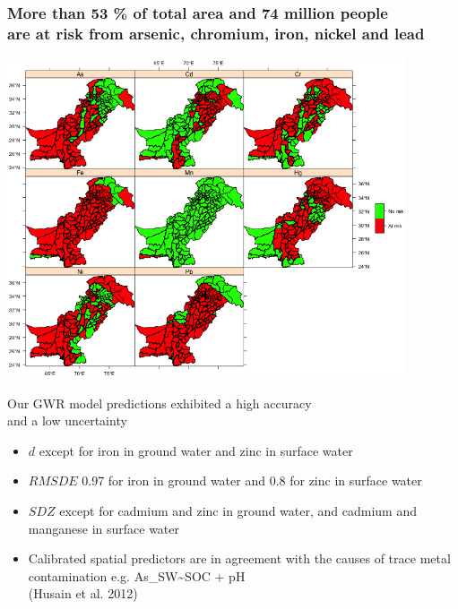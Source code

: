 \documentclass[10pt, compress]{beamer}
\begin{document}
\begin{frame}[fragile]
  \frametitle{More than 53 \% of total area and 74 million people \protect\\ are at risk from arsenic, chromium, iron, nickel and lead}

  \centering
  \includegraphics[width=0.88\textwidth]{images/Surface_water_risk.png}
\end{frame}

\begin{frame}{Our GWR model predictions exhibited a high accuracy \protect\\ and a low uncertainty}
      \begin{itemize}
        \item \alert{$d$ } except for iron in ground water and zinc in surface water
        \pause
        \item \alert{$RMSDE$ } 0.97 for iron in ground water and 0.8 for zinc in surface water
        \pause
        \item \alert{$SDZ$ } except for cadmium and zinc in ground water, and cadmium and manganese in surface water
        \pause
        \item \alert{Calibrated spatial predictors are in agreement with the causes of trace metal contamination} e.g. As\_SW\textasciitilde SOC + pH \\ (Husain et al. 2012)
      \end{itemize}
\end{frame}
\end{document}
